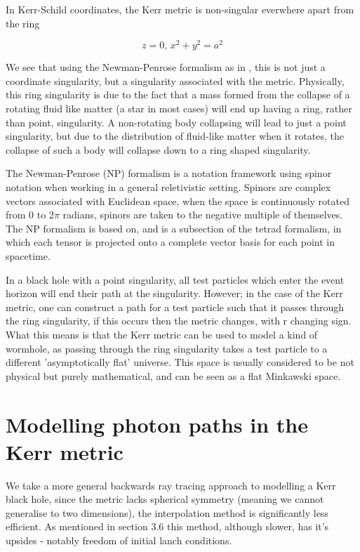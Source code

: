 \documentclass[oneside,openright,frontopenright, singlespacing]{dmathesis}
\begin{document}
\vspace{1em}
	In Kerr-Schild coordinates, the Kerr metric is non-singular everwhere apart from the ring

	\[z=0\mbox{, } x^2+y^2=a^2\]

\vspace{1em}
	We see that using the Newman-Penrose formalism as in \cite{kerr2008discovering}, this is not just a coordinate singularity, but a singularity associated with the metric. Physically, this ring singularity is due to the fact that a mass formed from the collapse of a rotating fluid like matter (a star in most cases) will end up having a ring, rather than point, singularity. A non-rotating body collapsing will lead to just a point singularity, but due to the distribution of fluid-like matter when it rotates, the collapse of such a body will collapse down to a ring shaped singularity.

\vspace{1em}
	The Newman-Penrose (NP) formalism is a notation framework using spinor notation when working in a general reletivistic setting. Spinors are complex vectors associated with Euclidean space,  when the space is continuously rotated from 0 to 2$\pi$ radians, spinors are taken to the negative multiple of themselves. The NP formalism is based on, and is a subsection of the tetrad formalism, in which each tensor is projected onto a complete vector basis for each point in spacetime.

\vspace{1em}
	In a black hole with a point singularity, all test particles which enter the event horizon will end their path at the singularity. However; in the case of the Kerr metric, one can construct a path for a test particle such that it passes through the ring singularity, if this occurs then the metric changes, with r changing sign. What this means is that the Kerr metric can be used to model a kind of wormhole, as passing through the ring singularity takes a test particle to a different 'asymptotically flat' universe. This space is usually considered to be not physical but purely mathematical, and can be seen as a flat Minkawski space.

\chapter{Modelling photon paths in the Kerr metric}

	We take a more general backwards ray tracing approach to modelling a Kerr black hole, since the metric lacks spherical symmetry (meaning we cannot generalise to two dimensions), the interpolation method is significantly less efficient. As mentioned in section 3.6 this method, although slower, has it's upsides - notably freedom of initial lanch conditions.
	
\end{document}
